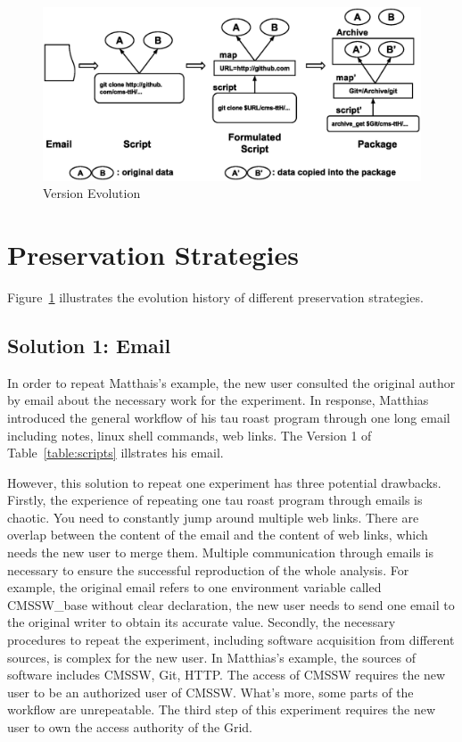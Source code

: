\documentclass{acm_proc_article-sp}
\begin{document}
\begin{figure}
\centering
\includegraphics[width=1.6\columnwidth]{version-evolution.eps}
\caption{Version Evolution}
\label{fig:version-evolution}
\end{figure}

\section{Preservation Strategies}

Figure~\ref{fig:version-evolution} illustrates the evolution history of different preservation strategies.

\subsection{Solution 1: Email}

In order to repeat Matthais's example, the new user consulted the original
author by email about the necessary work for the experiment. In response,
Matthias introduced the general workflow of his tau roast program through one long
email including notes, linux shell commands, web links. The Version 1 of
Table~\ref{table:scripts} illstrates his email.

However, this solution to repeat one experiment has three potential drawbacks.
Firstly, the experience of repeating one tau roast program through emails is
chaotic. You need to constantly jump around multiple web links. There are overlap
between the content of the email and the content of web links, which needs the
new user to merge them. Multiple communication through emails is necessary to
ensure the successful reproduction of the whole analysis. For example, the original
email refers to one environment variable called CMSSW\_base without clear
declaration, the new user needs to send one email to the original writer to
obtain its accurate value. Secondly, the necessary procedures to repeat the
experiment, including software acquisition from different sources, is complex
for the new user. In Matthias's example, the sources of software includes
CMSSW, Git, HTTP. The access of CMSSW requires the new user to be an authorized
user of CMSSW. What's more, some parts of the workflow are unrepeatable. The
third step of this experiment requires the new user to own the access authority
of the Grid. 
\end{document}
